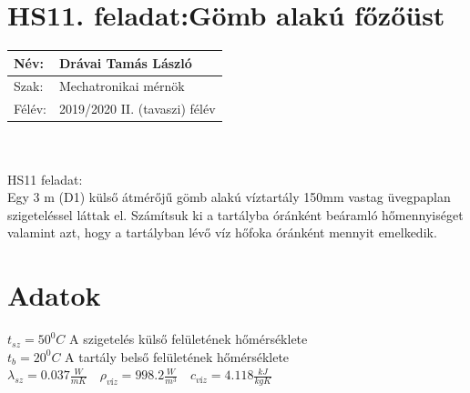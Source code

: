 

\section*{HS11. feladat:Gömb alakú főzőüst }

\begin{tabular}{ | p{1.75cm} | p{11cm} | } 
	\hline
	Név: & Drávai Tamás László\\ 
	\hline
	Szak: & Mechatronikai mérnök \\ 
	\hline
	Félév: & 2019/2020 II. (tavaszi) félév \\ 
	\hline
\end{tabular}
\\
\\
HS11 feladat:\\
Egy 3 m (D1) külső átmérőjű gömb alakú víztartály 150mm vastag üvegpaplan szigeteléssel láttak el. Számítsuk ki a tartályba óránként beáramló hőmennyiséget valamint azt, hogy a tartályban lévő víz hőfoka óránként mennyit emelkedik.
\section*{Adatok}
$t_{sz}=50^{0}C $ A szigetelés külső felületének hőmérséklete
\\ 
$t_{b}=20^{0}C $ A tartály belső felületének hőmérséklete
\\ 
$\lambda_{sz}=0.037 \frac{W}{mK}\quad 
\rho_{víz} =998.2 \frac{W}{m^3} \quad 
c_{víz}=4.118 \frac{kJ}{kgK}$
